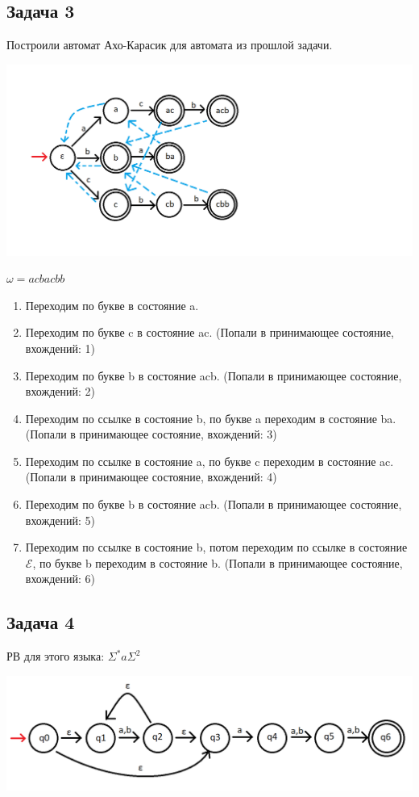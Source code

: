 \documentclass[a4paper,14pt]{article} %
\begin{document}
\subsection{Задача 3}
Построили автомат Ахо-Карасик для автомата из прошлой задачи. 

\includegraphics[scale=0.74]{06.png}

$\omega = acbacbb$
\begin{enumerate}
    \item Переходим по букве в состояние a.
    \item Переходим по букве c в состояние ac. 
    (Попали в принимающее состояние, вхождений: 1)
    \item Переходим по букве b в состояние acb.
    (Попали в принимающее состояние, вхождений: 2)
    \item Переходим по ссылке в состояние b, по букве a переходим в состояние ba. 
    (Попали в принимающее состояние, вхождений: 3)
    \item Переходим по ссылке в состояние a, по букве c переходим в состояние ac.
    (Попали в принимающее состояние, вхождений: 4)
    \item Переходим по букве b в состояние acb.
    (Попали в принимающее состояние, вхождений: 5)
    \item Переходим по ссылке в состояние b, потом переходим по ссылке в состояние $\mathcal{E}$, по букве b переходим в состояние b.
    (Попали в принимающее состояние, вхождений: 6)
\end{enumerate}

\subsection{Задача 4}
РВ для этого языка: $\Sigma^{*}a\Sigma^2$

\includegraphics[scale=0.64]{07.png}
\end{document}
